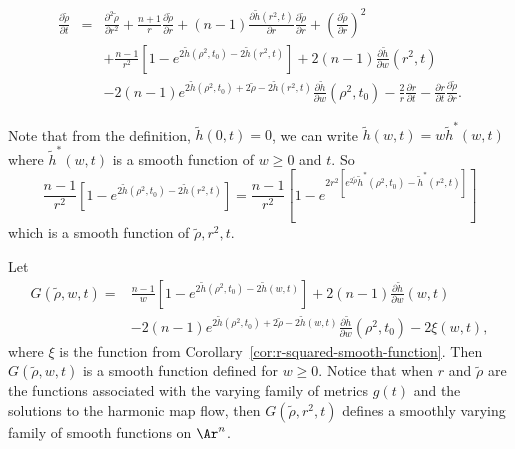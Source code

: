 \begin{eqnarray}\label{newform}
\frac{\partial\tilde{\rho} }{\partial t} & = &
\frac{\partial^{2}\tilde{\rho}}{\partial r^{2}}+\frac{n+1}{r}\frac
{\partial\tilde{\rho}}{\partial r}
 +\left(  n-1\right) \frac{\partial\tilde{h}(
r^{2},t)}{\partial r}  \frac{\partial\tilde{\rho} }{\partial r}
+\left( \frac{\partial\tilde{\rho}
}{\partial r}\right)  ^{2}    \\
& & +\frac{n-1}{r^{2}}\left[  1-e^{2\tilde{h}\left(
\rho^{2},t_0\right) -2\tilde{h}\left(  r^{2},t\right)  }\right]
 +2\left(  n-1\right)  \frac{\partial\tilde{h}}{\partial w}\left(  r^{2},t\right) \nonumber \\
&  & -2\left(  n-1\right)  e^{2\tilde{h}\left(  \rho ^{2},t_0\right)
+2\tilde{\rho}  -2\tilde{h}\left( r^{2},t\right)
}\frac{\partial\tilde{h}}{\partial w}(\rho^2,t_0)
-\frac{2}{r}\frac{\partial r}{\partial t}-\frac{\partial r}{\partial
t} \frac{\partial\tilde{\rho} }{\partial r} .\nonumber
\end{eqnarray}

Note that from the definition, $\tilde{h}\left( 0,t \right)=0$, we
can write $\tilde{h}\left( w,t \right)=w \tilde{h}^*(w,t)$ where
$\tilde{h}^*(w,t)$ is a smooth function of $w\ge 0$ and $t$. So
$$
\frac{n-1}{r^{2}}\left[  1-e^{2\tilde{h}\left( \rho^{2},t_0\right)
-2\tilde{h}\left(  r^{2},t\right)  }\right] =\frac{n-1}{r^{2}}\left[
1-e^{2r^2\left[ e^{2\tilde{\rho}} \tilde{h}^*\left(
\rho^{2},t_0\right)  -\tilde{h}^*\left( r^{2},t\right) \right]
}\right]
$$
which is a smooth function of $\tilde{\rho},r^2,t$.

Let
\begin{align}
G(\tilde{\rho},w,t) = & \frac{n-1}{w}\left[ 1-e^{2\tilde{h}\left(
\rho^{2},t_0\right)  -2\tilde{h}\left( w,t\right)  }\right]
 +2\left(  n-1\right)  \frac{\partial\tilde{h}}{\partial w}\left(  w,
 t\right) \nonumber \\
& -2\left(  n-1\right)  e^{2\tilde{h}\left(  \rho ^{2},t_0\right)
+2\tilde{\rho}  -2\tilde{h}\left( w,t\right) }\frac{\partial\tilde
h}{\partial w}(\rho^2,t_0) -2\xi(w,t), \label{defofG}
\end{align}
where $\xi$ is the function from Corollary~\ref{cor:r-squared-smooth-function}. Then
$G(\tilde{\rho},w,t)$ is a smooth function defined for $w\ge 0$.
Notice that when $r$ and $\tilde \rho$ are the functions associated
with the varying family of metrics $g(t)$ and the solutions to the
harmonic map flow, then $G(\tilde\rho,r^2,t)$ defines a smoothly
varying family of smooth functions on $\Ar^n$.


